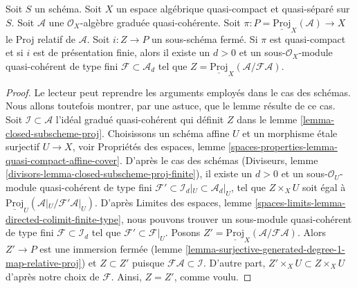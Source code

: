 \begin{lemma}
\label{lemma-closed-subscheme-proj-finite}
Soit $S$ un schéma. Soit $X$ un espace algébrique quasi-compact et quasi-séparé
sur $S$.
Soit $\mathcal{A}$ une $\mathcal{O}_X$-algèbre graduée quasi-cohérente. Soit
$\pi : P = \underline{\text{Proj}}_X(\mathcal{A}) \to X$ le Proj relatif
de $\mathcal{A}$. Soit $i : Z \to P$ un sous-schéma fermé.
Si $\pi$ est quasi-compact et si $i$ est de présentation finie, alors il existe
un $d > 0$ et un sous-$\mathcal{O}_X$-module quasi-cohérent de type fini
$\mathcal{F} \subset \mathcal{A}_d$ tel que
$Z = \underline{\text{Proj}}_X(\mathcal{A}/\mathcal{F}\mathcal{A})$.
\end{lemma}

\begin{proof}
Le lecteur peut reprendre les arguments employés dans le cas des schémas. Nous
allons toutefois montrer, par une astuce, que le lemme résulte de ce cas.
Soit $\mathcal{I} \subset \mathcal{A}$ l'idéal gradué quasi-cohérent
qui définit $Z$ dans le lemme \ref{lemma-closed-subscheme-proj}.
Choisissons un schéma affine $U$ et un morphisme \'etale surjectif
$U \to X$, voir Propriétés des espaces, lemme
\ref{spaces-properties-lemma-quasi-compact-affine-cover}.
D'après le cas des schémas
(Diviseurs, lemme \ref{divisors-lemma-closed-subscheme-proj-finite}),
il existe un $d > 0$ et un
sous-$\mathcal{O}_U$-module quasi-cohérent de type fini
$\mathcal{F}' \subset \mathcal{I}_d|_U \subset \mathcal{A}_d|_U$,
tel que $Z \times_X U$ soit égal à
$\underline{\text{Proj}}_U(\mathcal{A}|_U/\mathcal{F}'\mathcal{A}|_U)$.
D'après Limites des espaces, lemme
\ref{spaces-limits-lemma-directed-colimit-finite-type},
nous pouvons trouver un sous-module quasi-cohérent de type fini
$\mathcal{F} \subset \mathcal{I}_d$ tel que
$\mathcal{F}' \subset \mathcal{F}|_U$. Posons
$Z' = \underline{\text{Proj}}_X(\mathcal{A}/\mathcal{F}\mathcal{A})$.
Alors $Z' \to P$ est une immersion fermée
(lemme \ref{lemma-surjective-generated-degree-1-map-relative-proj})
et $Z \subset Z'$ puisque $\mathcal{F}\mathcal{A} \subset \mathcal{I}$.
D'autre part, $Z' \times_X U \subset Z \times_X U$ d'après notre
choix de $\mathcal{F}$. Ainsi, $Z = Z'$, comme voulu.
\end{proof}

